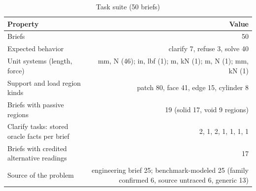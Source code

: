 \begin{table}[t]
\centering\small
\caption{Task suite (50 briefs)}
\label{tab:t1_suite}
\begin{tabular}{lr}
\toprule
Property & Value \\
\midrule
Briefs & 50 \\
Expected behavior & clarify 7, refuse 3, solve 40 \\
Unit systems (length, force) & mm, N (46); in, lbf (1); m, kN (1); m, N (1); mm, kN (1) \\
Support and load region kinds & patch 80, face 41, edge 15, cylinder 8 \\
Briefs with passive regions & 19 (solid 17, void 9 regions) \\
Clarify tasks: stored oracle facts per brief & 2, 1, 2, 1, 1, 1, 1 \\
Briefs with credited alternative readings & 17 \\
Source of the problem & engineering brief 25; benchmark-modeled 25 (family confirmed 6, source untraced 6, generic 13) \\
\bottomrule
\end{tabular}
\end{table}
